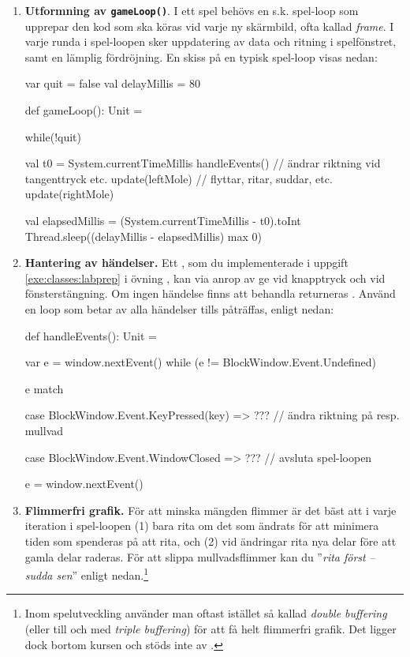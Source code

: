 \begin{enumerate}[leftmargin=*]
\item \textbf{Utformning av \texttt{gameLoop()}}. I ett spel behövs en s.k. spel-loop  som upprepar den kod som ska köras vid varje ny skärmbild, ofta kallad \emph{frame}. I varje runda i spel-loopen sker uppdatering av data och ritning i spelfönstret, samt en lämplig fördröjning. En skiss på en typisk spel-loop visas nedan:
\begin{CodeSmall}
  var quit = false
  val delayMillis = 80

  def gameLoop(): Unit = {
    while(!quit) {
      val t0 = System.currentTimeMillis
      handleEvents()    // ändrar riktning vid tangenttryck etc.
      update(leftMole)  // flyttar, ritar, suddar, etc.
      update(rightMole)

      val elapsedMillis = (System.currentTimeMillis - t0).toInt
      Thread.sleep((delayMillis - elapsedMillis) max 0)
    }
  }
\end{CodeSmall}

\item \textbf{Hantering av händelser.} Ett , som du implementerade i uppgift \ref{exe:classes:labprep} i övning \texttt{\ExeWeekFIVE}, kan via anrop av  ge    vid knapptryck och  vid fönsterstängning. Om ingen händelse finns att behandla returneras . Använd en loop som betar av alla händelser tills  påträffas, enligt nedan:

\begin{CodeSmall}
  def handleEvents(): Unit = {
    var e = window.nextEvent()
    while (e != BlockWindow.Event.Undefined) {
      e match {
        case BlockWindow.Event.KeyPressed(key) =>
          ???  // ändra riktning på resp. mullvad

        case BlockWindow.Event.WindowClosed =>
          ???  // avsluta spel-loopen
      }
      e = window.nextEvent()
    }
  }
\end{CodeSmall}

\item \textbf{Flimmerfri grafik.} För att minska mängden flimmer  är det bäst att i varje iteration i spel-loopen (1) bara rita om det som ändrats för att minimera tiden som spenderas på att rita, och (2) vid ändringar rita nya delar före att gamla delar raderas. För att slippa mullvadsflimmer kan du ''\emph{rita först -- sudda sen}'' enligt nedan.\footnote{Inom spelutveckling använder man oftast istället så kallad \emph{double buffering} (eller till och med \emph{triple buffering}) för att få helt flimmerfri grafik. Det ligger dock bortom kursen och stöds inte av .}


\end{enumerate}
